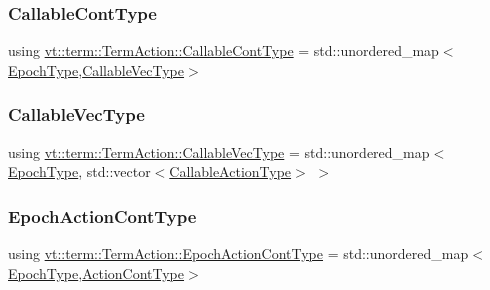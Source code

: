 \subsubsection{\texorpdfstring{Callable\+Cont\+Type}{CallableContType}}
{\footnotesize\ttfamily using \hyperlink{structvt_1_1term_1_1_term_action_a802aaa899ce87dc9f8a53d43b202044c}{vt\+::term\+::\+Term\+Action\+::\+Callable\+Cont\+Type} =  std\+::unordered\+\_\+map$<$\hyperlink{namespacevt_a81d11b28122d43bf9834577e4a06440f}{Epoch\+Type},\hyperlink{structvt_1_1term_1_1_term_action_a22cab5da9e6f6736aef4e20ad1d5356b}{Callable\+Vec\+Type}$>$}

\mbox{\label{structvt_1_1term_1_1_term_action_a22cab5da9e6f6736aef4e20ad1d5356b}} 
\subsubsection{\texorpdfstring{Callable\+Vec\+Type}{CallableVecType}}
{\footnotesize\ttfamily using \hyperlink{structvt_1_1term_1_1_term_action_a22cab5da9e6f6736aef4e20ad1d5356b}{vt\+::term\+::\+Term\+Action\+::\+Callable\+Vec\+Type} =  std\+::unordered\+\_\+map$<$ \hyperlink{namespacevt_a81d11b28122d43bf9834577e4a06440f}{Epoch\+Type}, std\+::vector$<$\hyperlink{structvt_1_1term_1_1_term_action_aa4a32326730b20530526e1db6512c017}{Callable\+Action\+Type}$>$ $>$}

\mbox{\label{structvt_1_1term_1_1_term_action_acefe3cb1e2a2bcf0d530082f53a2bada}} 
\subsubsection{\texorpdfstring{Epoch\+Action\+Cont\+Type}{EpochActionContType}}
{\footnotesize\ttfamily using \hyperlink{structvt_1_1term_1_1_term_action_acefe3cb1e2a2bcf0d530082f53a2bada}{vt\+::term\+::\+Term\+Action\+::\+Epoch\+Action\+Cont\+Type} =  std\+::unordered\+\_\+map$<$\hyperlink{namespacevt_a81d11b28122d43bf9834577e4a06440f}{Epoch\+Type},\hyperlink{structvt_1_1term_1_1_term_action_aec4a5ca3c0b2d9ae23defb65d27d2984}{Action\+Cont\+Type}$>$}

